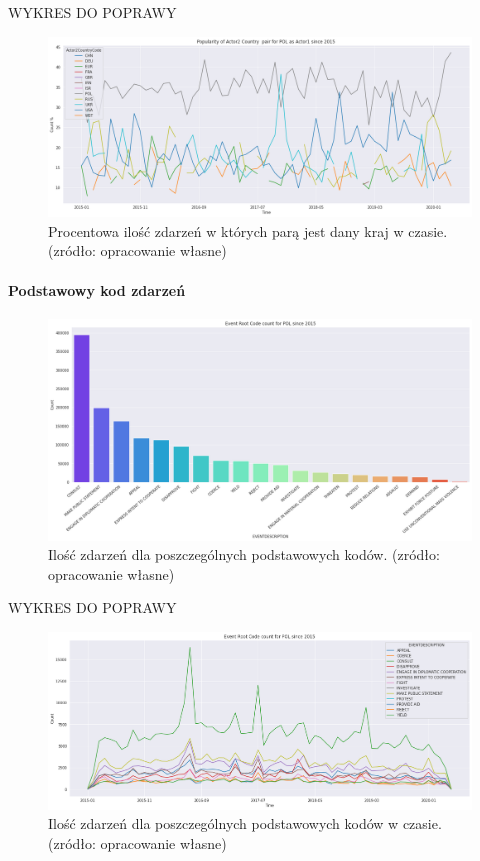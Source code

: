 \documentclass[11pt]{report}
\begin{document}
    WYKRES DO POPRAWY
    \begin{figure}[ht]
        \centering
        \includegraphics[width=1 \textwidth]{fig/PL/PLactor2PairPercinTIME.png}
        \caption{Procentowa ilość zdarzeń w których parą jest dany kraj w czasie. (zródło: opracowanie własne)}
        \label{fig:PLpairPerc}
    \end{figure}

    \paragraph{Podstawowy kod zdarzeń}

    \begin{figure}[ht]
        \centering
        \includegraphics[width=1 \textwidth]{fig/PL/PLERC.png}
        \caption{Ilość zdarzeń dla poszczególnych podstawowych kodów. (zródło: opracowanie własne)}
        \label{fig:PLPERC}
    \end{figure}

    WYKRES DO POPRAWY
    \begin{figure}[ht]
        \centering
        \includegraphics[width=1 \textwidth]{fig/PL/PLERCinTIME.png}
        \caption{Ilość zdarzeń dla poszczególnych podstawowych kodów w czasie. (zródło: opracowanie własne)}
        \label{fig:PLPERCinTIME}
    \end{figure}
\end{document}

